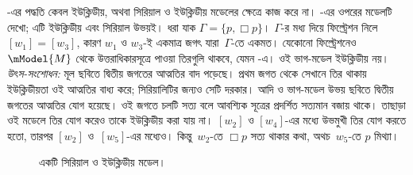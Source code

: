 \documentclass[../../../include/open-logic-section]{subfiles}
\begin{document}


-এর পদ্ধতি কেবল ইউক্লিডীয়, অথবা সিরিয়াল ও ইউক্লিডীয় মডেলের ক্ষেত্রে কাজ করে না। -এর ওপরের মডেলটি দেখো; এটি ইউক্লিডীয় এবং সিরিয়াল উভয়ই। ধরা যাক $\Gamma = \{p, \Box p \}$। $\Gamma$-র মধ্য দিয়ে ফিল্ট্রেশন নিলে $[w_1] = [w_3]$, কারণ $w_1$ ও $w_3$-ই একমাত্র জগৎ যারা~$\Gamma$-তে একমত। যেকোনো ফিল্ট্রেশনেও $\mModel{M}$ থেকে উত্তরাধিকারসূত্রে পাওয়া তিরগুলি থাকবে, যেমন -এ। ওই ভাগ-মডেল ইউক্লিডীয় নয়।
\emph{উৎস-সংশোধন:} মূল ছবিতে দ্বিতীয় জগতের আত্মতির বাদ পড়েছে। প্রথম জগত থেকে সেখানে তির থাকায় ইউক্লিডীয়তা ওই আত্মতির বাধ্য করে; সিরিয়ালিটির জন্যও সেটি দরকার। আদি ও ভাগ-মডেল উভয় ছবিতে দ্বিতীয় জগতের আত্মতির যোগ হয়েছে। ওই জগতে চলটি সত্য বলে আবশ্যিক সূত্রের প্রদর্শিত সত্যমান বজায় থাকে।
 তাছাড়া ওই মডেলে তির যোগ করেও তাকে ইউক্লিডীয় করা যায় না। $[w_2]$ ও $[w_4]$-এর মধ্যে উভমুখী তির যোগ করতে হতো, তারপর $[w_2]$ ও~$[w_5]$-এর মধ্যেও। কিন্তু~$w_2$-তে $\Box
p$ সত্য থাকার কথা, অথচ~$w_5$-তে $p$ মিথ্যা।

\begin{figure}[htpb]
  \centering
  \caption{একটি সিরিয়াল ও ইউক্লিডীয় মডেল।}
\end{figure}
\end{document}
